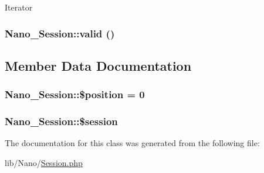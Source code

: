 Iterator \hypertarget{classNano__Session_bab2a2a0bb38e5dcee1e4ac2a6456d24}{
\subsubsection[{valid}]{\setlength{\rightskip}{0pt plus 5cm}Nano\_\-Session::valid ()}}
\label{classNano__Session_bab2a2a0bb38e5dcee1e4ac2a6456d24}




\subsection{Member Data Documentation}
\hypertarget{classNano__Session_3a4e100cedefa4e473e8adce6cf9a914}{
\subsubsection[{\$position}]{\setlength{\rightskip}{0pt plus 5cm}Nano\_\-Session::\$position = 0}}
\label{classNano__Session_3a4e100cedefa4e473e8adce6cf9a914}


\hypertarget{classNano__Session_18f5c411ce061ae44379b191b832dd39}{
\subsubsection[{\$session}]{\setlength{\rightskip}{0pt plus 5cm}Nano\_\-Session::\$session}}
\label{classNano__Session_18f5c411ce061ae44379b191b832dd39}




The documentation for this class was generated from the following file:\begin{CompactItemize}
\item 
lib/Nano/\hyperlink{Session_8php}{Session.php}\end{CompactItemize}
